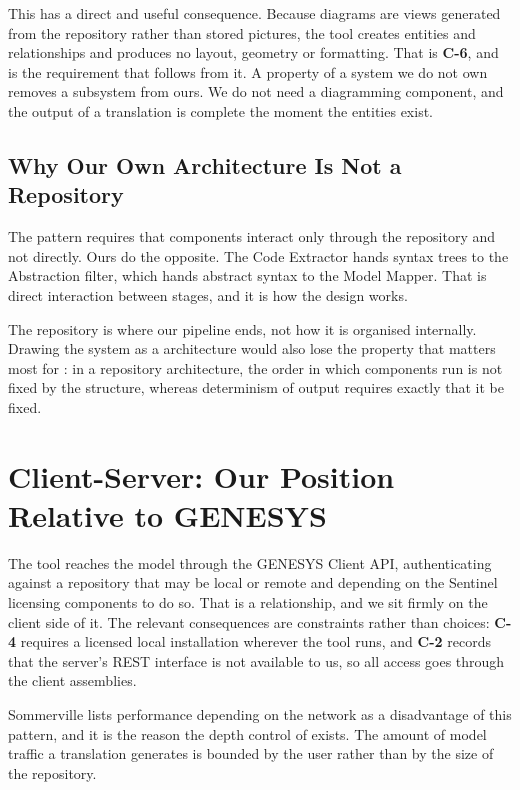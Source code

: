 This has a direct and useful consequence. Because diagrams are views generated
from the repository rather than stored pictures, the tool creates entities and
relationships and produces no layout, geometry or formatting. That is
\textbf{C-6}, and  is the requirement that follows from it. A
property of a system we do not own removes a subsystem from ours. We do not need a diagramming component, and the output of a
translation is complete the moment the entities exist.

\subsection{Why Our Own Architecture Is Not a Repository}

The pattern requires that components interact only through the repository and
not directly. Ours do the opposite. The Code Extractor hands syntax trees to the
Abstraction filter, which hands abstract syntax to the Model Mapper. That is
direct interaction between stages, and it is how the design works.

The repository is where our pipeline ends, not how it is organised internally.
Drawing the system as a  architecture would also lose the
property that matters most for : in a repository architecture, the
order in which components run is not fixed by the structure, whereas determinism
of output requires exactly that it be fixed.

\section{Client-Server: Our Position Relative to GENESYS}

The tool reaches the model through the GENESYS Client API, authenticating
against a repository that may be local or remote and depending on the Sentinel
licensing components to do so. That is a  relationship,
and we sit firmly on the client side of it. The relevant consequences are
constraints rather than choices: \textbf{C-4} requires a licensed local
installation wherever the tool runs, and \textbf{C-2} records that the server's
REST interface is not available to us, so all access goes through the client
assemblies.

Sommerville lists performance depending on the network as a disadvantage of this
pattern, and it is the reason the depth control of  exists. The amount
of model traffic a translation generates is bounded by the user rather than by
the size of the repository.

